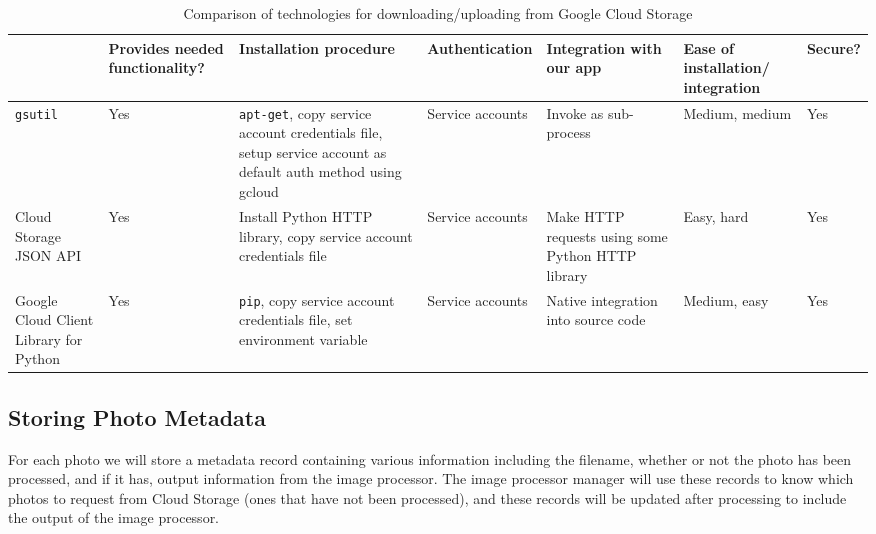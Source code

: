 \documentclass[10pt, onecolumn, draftclsnofoot, letterpaper, compsoc]{IEEEtran}
\begin{document}
\begin{table}[h]
\centering
\caption{Comparison of technologies for downloading/uploading from Google Cloud Storage}
\begin{tabular}{|p{1.8cm}|p{1.4cm}|p{3cm}|p{1.8cm}|p{1.8cm}|p{1.8cm}|p{1cm}|}
\cline{4-4}
\hline

 & Provides needed functionality? & Installation procedure & Authentication
 & Integration with our app & Ease of installation/ integration & Secure? \\ \hline

{\tt gsutil} & Yes & {\tt apt-get}, copy service account credentials file, setup service
account as default auth method using gcloud & Service accounts & Invoke as
sub-process & Medium, medium & Yes \\ \hline

Cloud Storage JSON API & Yes & Install Python HTTP library, copy service
account credentials file & Service accounts & Make HTTP requests using
some Python HTTP library & Easy, hard & Yes \\ \hline

Google Cloud Client Library for Python & Yes & {\tt pip}, copy service account
credentials file, set environment variable & Service accounts & Native
integration into source code & Medium, easy & Yes \\ \hline

\end{tabular}
\label{table:bret1}
\end{table}

\subsection{Storing Photo Metadata}

For each photo we will store a metadata record containing various information
including the filename, whether or not the photo has been processed, and if it
has, output information from the image processor. The image processor manager
will use these records to know which photos to request from Cloud Storage
(ones that have not been processed), and these records will be updated after
processing to include the output of the image processor. \\
\end{document}
